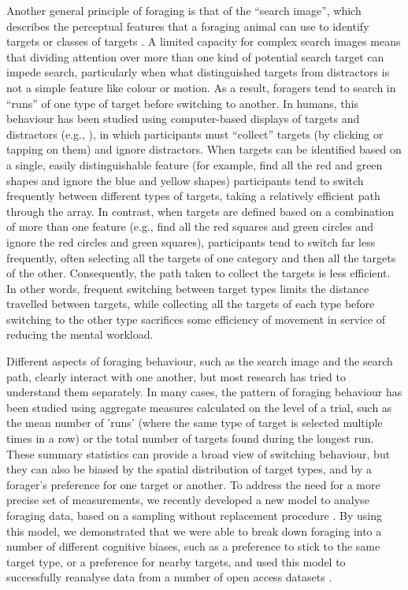 \documentclass[vision,article,accept,pdftex,moreauthors]{Definitions/mdpi}
\begin{document}
Another general principle of foraging is that of the “search image”, which describes the perceptual features that a foraging animal can use to identify targets or classes of targets \cite{Dukas1993}. A limited capacity for complex search images means that dividing attention over more than one kind of potential search target can impede search, particularly when what distinguished targets from distractors is not a simple feature like colour or motion. As a result, foragers tend to search in “runs” of one type of target before switching to another. In humans, this behaviour has been studied using computer-based displays of targets and distractors (e.g., \citep{kristjansson2014}), in which participants must “collect” targets (by clicking or tapping on them) and ignore distractors. When targets can be identified based on a single, easily distinguishable feature (for example, find all the red and green shapes and ignore the blue and yellow shapes) participants tend to switch frequently between different types of targets, taking a relatively efficient path through the array. In contrast, when targets are defined based on a combination of more than one feature (e.g., find all the red squares and green circles and ignore the red circles and green squares), participants tend to switch far less frequently, often selecting all the targets of one category and then all the targets of the other. Consequently, the path taken to collect the targets is less efficient. In other words, frequent switching between target types limits the distance travelled between targets, while collecting all the targets of each type before switching to the other type sacrifices some efficiency of movement in service of reducing the mental workload. 

Different aspects of foraging behaviour, such as the search image and the search path, clearly interact with one another, but most research has tried to understand them separately. In many cases, the pattern of foraging behaviour has been studied using aggregate measures calculated on the level of a trial, such as the mean number of 'runs' (where the same type of target is selected multiple times in a row) or the total number of targets found during the longest run. These summary statistics can provide a broad view of switching behaviour, but they can also be biased by the spatial distribution of target types, and by a forager's preference for one target or another. To address the need for a more precise set of measurements, we recently developed a new model to analyse foraging data, based on a sampling without replacement procedure \cite{clarke2022foraging}. By using this model, we demonstrated that we were able to break down foraging into a number of different cognitive biases, such as a preference to stick to the same target type, or a preference for nearby targets, and used this model to successfully reanalyse data from a number of open access datasets \cite{kristjansson2014, thornton2022, clarke2022, tagu_kristjansson_2021}. 
\end{document}
